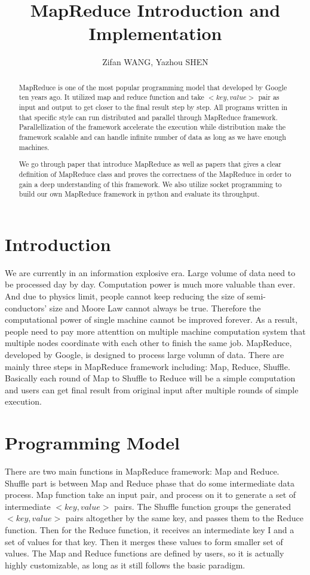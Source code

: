 \documentclass{article}
\title{MapReduce Introduction and Implementation}
\author{Zifan WANG, Yazhou SHEN}
\begin{document}
\maketitle

\begin{abstract}


MapReduce \cite{dean2008mapreduce} is one of the most popular programming model that developed by Google ten years ago. It utilized map and reduce function and take $<key, value>$ pair as input and 
output to get closer to the final result step by step. All programs written in that specific style can run distributed and parallel through MapReduce framework. Parallellization of the framework accelerate the 
execution while distribution make the framework scalable and can handle infinite number of data as long as we have enough machines.

We go through paper that introduce MapReduce as well as papers that gives a clear definition of MapReduce class and proves the correctness of the MapReduce in order to gain a deep understanding of this framework.
We also utilize socket programming to build our own MapReduce framework in python and evaluate its throughput.




\end{abstract}

\section{Introduction}
We are currently in an information explosive era. Large volume of data need to be processed day by day. Computation power is much more valuable than ever. And due to physics limit, people cannot keep reducing the size of semi-conductors' size and Moore Law cannot always be true. Therefore
the computational power of single machine cannot be improved forever. As a result, people need to pay more attenttion
on multiple machine computation system that multiple nodes coordinate with each other to finish the same job. MapReduce, developed by Google, is designed to process large volumn of data. There are mainly three steps in MapReduce framework including: Map, Reduce, Shuffle. Basically each round of Map to Shuffle to Reduce will be 
a simple computation and users can get final result from original input after multiple rounds of simple execution.

\section{Programming Model}
There are two main functions in MapReduce framework: Map
and Reduce. Shuffle part is between Map and Reduce phase that do some intermediate data process.
Map function  take an input pair, and process on it to generate a set
of intermediate $<key, value>$ pairs. The Shuffle function groups the generated
$<key, value>$ pairs altogether by the same key, and passes them to the Reduce
function. Then for the Reduce function, it receives an intermediate key I and a
set of values for that key. Then it merges these values to form smaller set of
values. The Map and Reduce functions are defined
by users, so it is actually highly customizable, as long as it still follows the basic
paradigm.
\end{document}
